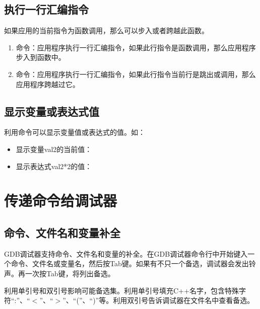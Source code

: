 \documentclass[a4paper,12pt,english]{sphinxmanual}
\begin{document}
\subsection{执行一行汇编指令}
\label{\detokenize{debug/debug:id19}}
\sphinxAtStartPar
如果应用的当前指令为函数调用，那么可以步入或者跨越此函数。
\begin{enumerate}
%
\item {} 
\sphinxAtStartPar
{}命令：应用程序执行一行汇编指令，如果此行指令是函数调用，那么应用程序步入到函数中。

\item {} 
\sphinxAtStartPar
{}命令：应用程序执行一行汇编指令，如果此行指令当前行是跳出或调用，那么应用程序跨越过它。

\end{enumerate}


\subsection{显示变量或表达式值}
\label{\detokenize{debug/debug:id20}}
\sphinxAtStartPar
利用命令可以显示变量值或表达式的值。如：
\begin{itemize}
\item {} 
\sphinxAtStartPar
显示变量val2的当前值：

\item {} 
\sphinxAtStartPar
显示表达式val2*2的值：

\end{itemize}


\section{传递命令给调试器}
\label{\detokenize{debug/debug:id21}}

\subsection{命令、文件名和变量补全}
\label{\detokenize{debug/debug:id22}}
\sphinxAtStartPar
GDB调试器支持命令、文件名和变量的补全。在GDB调试器命令行中开始键入一个命令、文件名或变量名，然后按Tab键。如果有不只一个备选，调试器会发出铃声。再一次按Tab键，将列出备选。

\sphinxAtStartPar
利用单引号和双引号影响可能备选集。利用单引号填充C++名字，包含特殊字符“:”、“\(<\)”、“\(>\)”、“(”、“)”等。利用双引号告诉调试器在文件名中查看备选。
\end{document}
